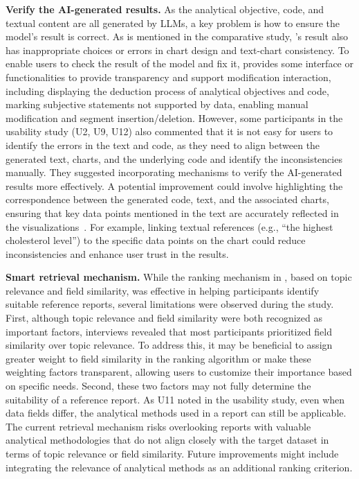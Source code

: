 \textbf{Verify the AI-generated results. }
As the analytical objective, code, and textual content are all generated by LLMs, a key problem is how to ensure the model's result is correct. 
As is mentioned in the comparative study, \system{}'s result also has inappropriate choices or errors in chart design and text-chart consistency. 
To enable users to check the result of the model and fix it, \system{} provides some interface or functionalities to provide transparency and support modification interaction, including displaying the deduction process of analytical objectives and code, marking subjective statements not supported by data, enabling manual modification and segment insertion/deletion. 
However, some participants in the usability study (U2, U9, U12) also commented that it is not easy for users to identify the errors in the text and code, as they need to align between the generated text, charts, and the underlying code and identify the inconsistencies manually. 
They suggested incorporating mechanisms to verify the AI-generated results more effectively. A potential improvement could involve highlighting the correspondence between the generated code, text, and the associated charts, ensuring that key data points mentioned in the text are accurately reflected in the visualizations~\cite{chen2022crossdata}. For example, linking textual references (e.g., ``the highest cholesterol level'') to the specific data points on the chart could reduce inconsistencies and enhance user trust in the results.

\textbf{Smart retrieval mechanism. }
While the ranking mechanism in \system{}, based on topic relevance and field similarity, was effective in helping participants identify suitable reference reports, several limitations were observed during the study.
First, although topic relevance and field similarity were both recognized as important factors, interviews revealed that most participants prioritized field similarity over topic relevance. To address this, it may be beneficial to assign greater weight to field similarity in the ranking algorithm or make these weighting factors transparent, allowing users to customize their importance based on specific needs.
Second, these two factors may not fully determine the suitability of a reference report. As U11 noted in the usability study, even when data fields differ, the analytical methods used in a report can still be applicable. The current retrieval mechanism risks overlooking reports with valuable analytical methodologies that do not align closely with the target dataset in terms of topic relevance or field similarity.
Future improvements might include integrating the relevance of analytical methods as an additional ranking criterion. 


